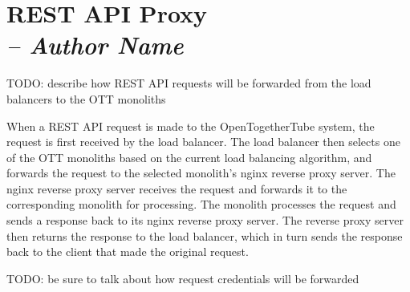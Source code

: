 \chapter{REST API Proxy \\
  \small{\textit{-- Author Name}}
  \label{Chapter::RestApiProxy}}


TODO: describe how REST API requests will be forwarded from the load balancers to the OTT monoliths

When a REST API request is made to the OpenTogetherTube system, the request is first received by the load balancer. The 
load balancer then selects one of the OTT monoliths based on the current load balancing algorithm, and forwards the 
request to the selected monolith's nginx reverse proxy server.
The nginx reverse proxy server receives the request and forwards it to the corresponding monolith for processing. 
The monolith processes the request and sends a response back to its nginx reverse proxy server. The reverse proxy server 
then returns the response to the load balancer, which in turn sends the response back to the client that made the original
request.

TODO: be sure to talk about how request credentials will be forwarded